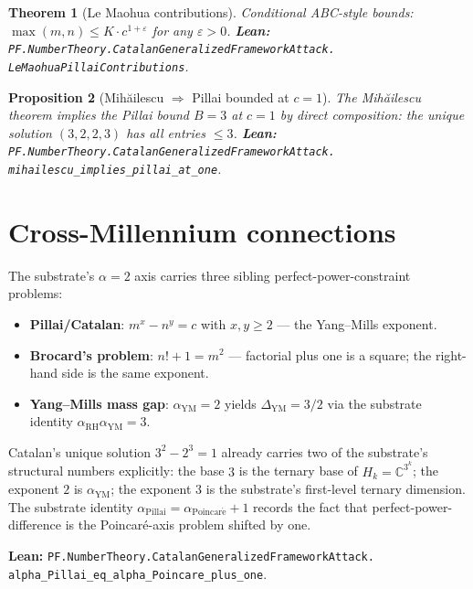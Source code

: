 \documentclass[11pt,a4paper]{article}
\theoremstyle{plain}
\newtheorem{theorem}{Theorem}[section]
\newtheorem{proposition}[theorem]{Proposition}
\theoremstyle{definition}
\begin{document}
\begin{theorem}[Le Maohua contributions]
\label{thm:lemaohua}
Conditional ABC-style bounds:
$\max(m, n) \le K \cdot c^{1 + \varepsilon}$
for any $\varepsilon > 0$.
\textbf{Lean:}
\texttt{PF.NumberTheory.CatalanGeneralizedFrameworkAttack.\\
LeMaohuaPillaiContributions}.
\end{theorem}

\begin{proposition}[Mih\u{a}ilescu $\Rightarrow$ Pillai bounded at $c = 1$]
\label{prop:mihailescu-pillai}
The Mih\u{a}ilescu theorem implies the Pillai bound $B = 3$ at
$c = 1$ by direct composition: the unique solution
$(3, 2, 2, 3)$ has all entries $\le 3$.
\textbf{Lean:}
\texttt{PF.NumberTheory.CatalanGeneralizedFrameworkAttack.\\
mihailescu\_implies\_pillai\_at\_one}.
\end{proposition}

\section{Cross-Millennium connections}

The substrate's $\alpha = 2$ axis carries three sibling
perfect-power-constraint problems:

\begin{itemize}[leftmargin=*]
\item \textbf{Pillai/Catalan}: $m^{x} - n^{y} = c$ with
$x, y \ge 2$ --- the Yang--Mills exponent.
\item \textbf{Brocard's problem}: $n! + 1 = m^{2}$ --- factorial
plus one is a square; the right-hand side is the same exponent.
\item \textbf{Yang--Mills mass gap}: $\alpha_{\mathrm{YM}} = 2$
yields $\Delta_{\mathrm{YM}} = 3/2$ via the substrate identity
$\alpha_{\mathrm{RH}} \alpha_{\mathrm{YM}} = 3$.
\end{itemize}

Catalan's unique solution $3^{2} - 2^{3} = 1$ already carries
two of the substrate's structural numbers explicitly: the base
$3$ is the ternary base of $H_{k} = \mathbb{C}^{3^{k}}$; the
exponent $2$ is $\alpha_{\mathrm{YM}}$; the exponent $3$ is the
substrate's first-level ternary dimension. The substrate identity
$\alpha_{\mathrm{Pillai}} = \alpha_{\mathrm{Poincar\acute e}} + 1$
records the fact that perfect-power-difference is the
Poincar\'e-axis problem shifted by one.

\textbf{Lean:}
\texttt{PF.NumberTheory.CatalanGeneralizedFrameworkAttack.\\
alpha\_Pillai\_eq\_alpha\_Poincare\_plus\_one}.
\end{document}
